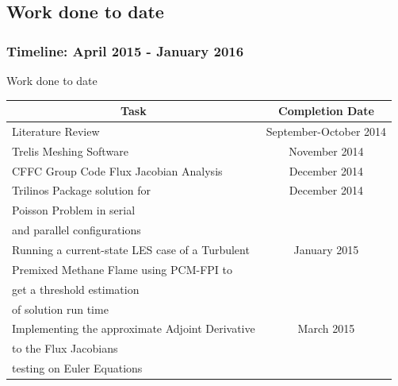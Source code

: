 \documentclass{beamer}
\begin{document}
\subsection[Present]{Work done to date}
\begin{frame}%
\frametitle{Timeline: April 2015  - January 2016}
\scriptsize

\begin{minipage}[t][1\textheight]{1\textwidth}
\vspace{-20pt}
\begin{exampleblock}{Work done to date}

\begin{tabular}{|l|c|} \hline
\multicolumn{1}{|c|}{\bf{Task}} & \multicolumn{1}{|c|}{\bf{Completion Date}} \\

\hline Literature Review & September-October 2014 \\

\hline Trelis Meshing Software & November 2014 \\

\hline CFFC Group Code Flux Jacobian Analysis & December 2014 \\

\hline Trilinos Package solution for & December 2014 \\ Poisson Problem in serial &\\and parallel configurations & \\

\hline Running a current-state LES case of a Turbulent & January 2015\\ Premixed  Methane Flame using PCM-FPI to & \\ get a threshold estimation & \\ of solution run time &\\

\hline Implementing the approximate Adjoint Derivative & March 2015 \\  to the Flux Jacobians &\\ testing on Euler Equations  &\\

\hline
\end{tabular}

\end{exampleblock}
\end{minipage}

\end{frame}
\end{document}
